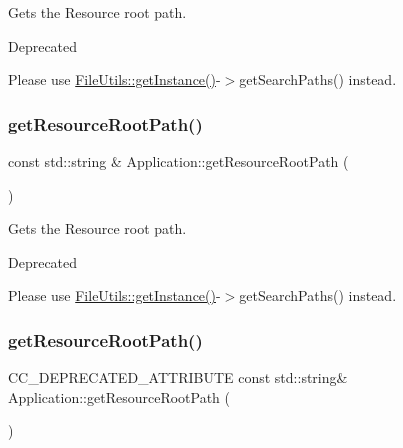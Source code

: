 Gets the Resource root path. \begin{DoxyRefDesc}{Deprecated}
\item[\hyperlink{deprecated__deprecated000362}{Deprecated}]Please use \hyperlink{classFileUtils_ac8ced4394d59f5459445ced27ccd0e8a}{File\+Utils\+::get\+Instance()}-\/$>$get\+Search\+Paths() instead. \end{DoxyRefDesc}
\mbox{\label{classApplication_ab0fc99cfeb7f303e68825bde2030ec3e}} 
\subsubsection{\texorpdfstring{get\+Resource\+Root\+Path()}{getResourceRootPath()}\hspace{0.1cm}{\footnotesize\ttfamily [5/8]}}
{\footnotesize\ttfamily const std\+::string \& Application\+::get\+Resource\+Root\+Path (\begin{DoxyParamCaption}\item[{void}]{ }\end{DoxyParamCaption})}

Gets the Resource root path. \begin{DoxyRefDesc}{Deprecated}
\item[\hyperlink{deprecated__deprecated000121}{Deprecated}]Please use \hyperlink{classFileUtils_ac8ced4394d59f5459445ced27ccd0e8a}{File\+Utils\+::get\+Instance()}-\/$>$get\+Search\+Paths() instead. \end{DoxyRefDesc}
\mbox{\label{classApplication_a669e0584fa243449d87b17bc31d19113}} 
\subsubsection{\texorpdfstring{get\+Resource\+Root\+Path()}{getResourceRootPath()}\hspace{0.1cm}{\footnotesize\ttfamily [6/8]}}
{\footnotesize\ttfamily C\+C\+\_\+\+D\+E\+P\+R\+E\+C\+A\+T\+E\+D\+\_\+\+A\+T\+T\+R\+I\+B\+U\+TE const std\+::string\& Application\+::get\+Resource\+Root\+Path (\begin{DoxyParamCaption}\item[{void}]{ }\end{DoxyParamCaption})}

